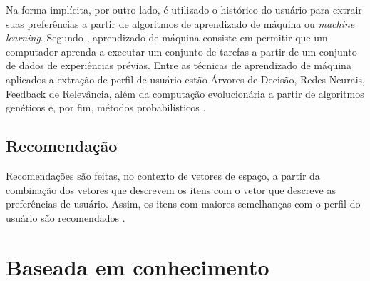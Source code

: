     Na forma implícita, por outro lado, é utilizado o histórico do usuário para extrair suas preferências a partir de algoritmos de aprendizado de máquina ou \textit{machine learning}. Segundo , aprendizado de máquina consiste em permitir que um computador aprenda a executar um conjunto de tarefas a partir de um conjunto de dados de experiências prévias.
    Entre as técnicas de aprendizado de máquina aplicados a extração de perfil de usuário estão Árvores de Decisão, Redes Neurais, Feedback de Relevância, além da computação evolucionária a partir de algoritmos genéticos e, por fim,  métodos probabilísticos \cite{Ricci2010}.
   
    \subsection{Recomendação}
    
    Recomendações são feitas, no contexto de vetores de espaço, a partir da combinação dos vetores que descrevem os itens com o vetor que descreve as preferências de usuário. Assim, os itens com maiores semelhanças com o perfil do usuário são recomendados \cite{Aggarwal2016}.

            
                
            
        
\section{Baseada em conhecimento} 
    
